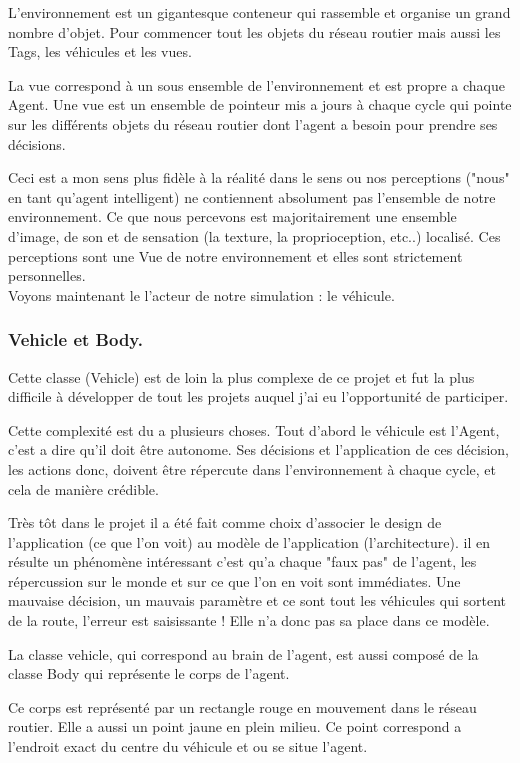 \documentclass[a4paper,11pt]{article}
\begin{document}
L'environnement est un gigantesque conteneur qui rassemble et organise un grand nombre d'objet. Pour commencer tout les objets du réseau routier mais aussi les Tags, les véhicules et les vues.

La vue correspond à un sous ensemble de l'environnement et est propre a chaque Agent. Une vue est un ensemble de pointeur mis a jours à chaque cycle qui pointe sur les différents objets du réseau routier dont l'agent a besoin pour prendre ses décisions.

Ceci est a mon sens plus fidèle à la réalité dans le sens ou nos perceptions ("nous" en tant qu'agent intelligent) ne contiennent absolument pas l'ensemble de notre environnement. Ce que nous percevons est majoritairement une ensemble d'image, de son et de sensation (la texture, la proprioception, etc..) localisé. Ces perceptions sont une Vue de notre environnement et elles sont strictement personnelles.  \\

Voyons maintenant le l'acteur de notre simulation : le véhicule.

\subsubsection{Vehicle et Body.}

Cette classe (Vehicle) est de loin la plus complexe de ce projet et fut la plus difficile à développer de tout les projets auquel j'ai eu l'opportunité de participer.

Cette complexité est du a plusieurs choses. Tout d'abord le véhicule est l'Agent, c'est a dire qu'il doit être autonome. Ses décisions et l'application de ces décision, les actions donc, doivent être répercute dans l'environnement à chaque cycle, et cela de manière crédible.

Très tôt dans le projet il a été fait comme choix d'associer le design de l'application (ce que l'on voit) au modèle de l'application (l'architecture). il en résulte un phénomène intéressant c'est qu'a chaque "faux pas" de l'agent, les répercussion sur le monde et sur ce que l'on en voit sont immédiates. Une mauvaise décision, un mauvais paramètre et ce sont tout les véhicules qui sortent de la route, l'erreur est saisissante ! Elle n'a donc pas sa place dans ce modèle.

La classe vehicle, qui correspond au brain de l'agent, est aussi composé de la classe Body qui représente le corps de l'agent.

Ce corps est représenté par un rectangle rouge en mouvement dans le réseau routier. Elle a aussi un point jaune en plein milieu. Ce point correspond a l'endroit exact du centre du véhicule et ou se situe l'agent.\\
\end{document}
